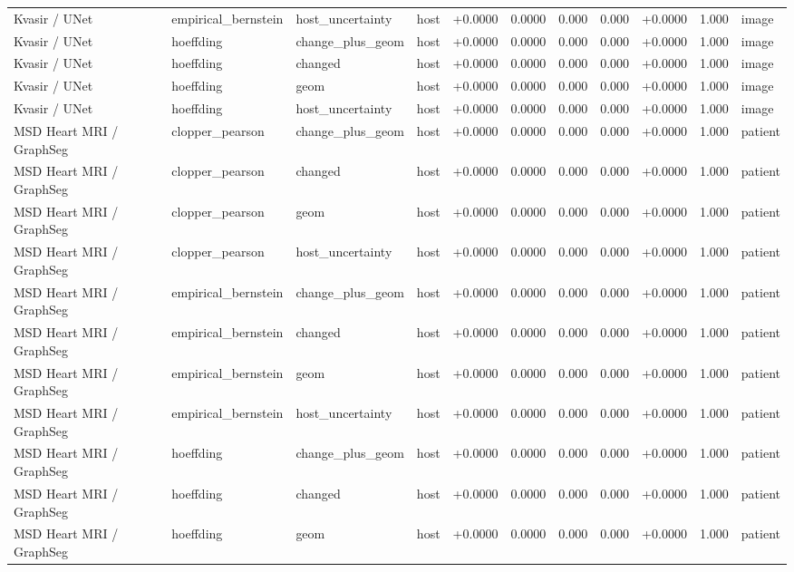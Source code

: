 \begin{table}[t]
\begin{tabular}{lllllllllll}
Kvasir / UNet & empirical\_bernstein & host\_uncertainty & host & +0.0000 & 0.0000 & 0.000 & 0.000 & +0.0000 & 1.000 & image \\
Kvasir / UNet & hoeffding & change\_plus\_geom & host & +0.0000 & 0.0000 & 0.000 & 0.000 & +0.0000 & 1.000 & image \\
Kvasir / UNet & hoeffding & changed & host & +0.0000 & 0.0000 & 0.000 & 0.000 & +0.0000 & 1.000 & image \\
Kvasir / UNet & hoeffding & geom & host & +0.0000 & 0.0000 & 0.000 & 0.000 & +0.0000 & 1.000 & image \\
Kvasir / UNet & hoeffding & host\_uncertainty & host & +0.0000 & 0.0000 & 0.000 & 0.000 & +0.0000 & 1.000 & image \\
MSD Heart MRI / GraphSeg & clopper\_pearson & change\_plus\_geom & host & +0.0000 & 0.0000 & 0.000 & 0.000 & +0.0000 & 1.000 & patient \\
MSD Heart MRI / GraphSeg & clopper\_pearson & changed & host & +0.0000 & 0.0000 & 0.000 & 0.000 & +0.0000 & 1.000 & patient \\
MSD Heart MRI / GraphSeg & clopper\_pearson & geom & host & +0.0000 & 0.0000 & 0.000 & 0.000 & +0.0000 & 1.000 & patient \\
MSD Heart MRI / GraphSeg & clopper\_pearson & host\_uncertainty & host & +0.0000 & 0.0000 & 0.000 & 0.000 & +0.0000 & 1.000 & patient \\
MSD Heart MRI / GraphSeg & empirical\_bernstein & change\_plus\_geom & host & +0.0000 & 0.0000 & 0.000 & 0.000 & +0.0000 & 1.000 & patient \\
MSD Heart MRI / GraphSeg & empirical\_bernstein & changed & host & +0.0000 & 0.0000 & 0.000 & 0.000 & +0.0000 & 1.000 & patient \\
MSD Heart MRI / GraphSeg & empirical\_bernstein & geom & host & +0.0000 & 0.0000 & 0.000 & 0.000 & +0.0000 & 1.000 & patient \\
MSD Heart MRI / GraphSeg & empirical\_bernstein & host\_uncertainty & host & +0.0000 & 0.0000 & 0.000 & 0.000 & +0.0000 & 1.000 & patient \\
MSD Heart MRI / GraphSeg & hoeffding & change\_plus\_geom & host & +0.0000 & 0.0000 & 0.000 & 0.000 & +0.0000 & 1.000 & patient \\
MSD Heart MRI / GraphSeg & hoeffding & changed & host & +0.0000 & 0.0000 & 0.000 & 0.000 & +0.0000 & 1.000 & patient \\
MSD Heart MRI / GraphSeg & hoeffding & geom & host & +0.0000 & 0.0000 & 0.000 & 0.000 & +0.0000 & 1.000 & patient \\

\end{tabular}
\end{table}
